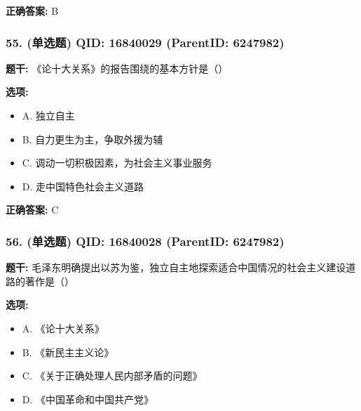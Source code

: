 \documentclass[12pt,UTF8]{ctexart}
\begin{document}
\textbf{正确答案:}
B

\vspace{0.3em}\hrulefill\vspace{0.7em}

\subsubsection*{55. (单选题) \small QID: 16840029 (ParentID: 6247982)}

\textbf{题干:}
《论十大关系》的报告围绕的基本方针是（）



\textbf{选项:}
\begin{itemize}[leftmargin=*]

  \item A. 独立自主

  \item B. 自力更生为主，争取外援为辅

  \item C. 调动一切积极因素，为社会主义事业服务

  \item D. 走中国特色社会主义道路

\end{itemize}

\textbf{正确答案:}
C

\vspace{0.3em}\hrulefill\vspace{0.7em}

\subsubsection*{56. (单选题) \small QID: 16840028 (ParentID: 6247982)}

\textbf{题干:}
毛泽东明确提出以苏为鉴，独立自主地探索适合中国情况的社会主义建设道路的著作是（）



\textbf{选项:}
\begin{itemize}[leftmargin=*]

  \item A. 《论十大关系》

  \item B. 《新民主主义论》

  \item C. 《关于正确处理人民内部矛盾的问题》

  \item D. 《中国革命和中国共产党》

\end{itemize}
\end{document}
